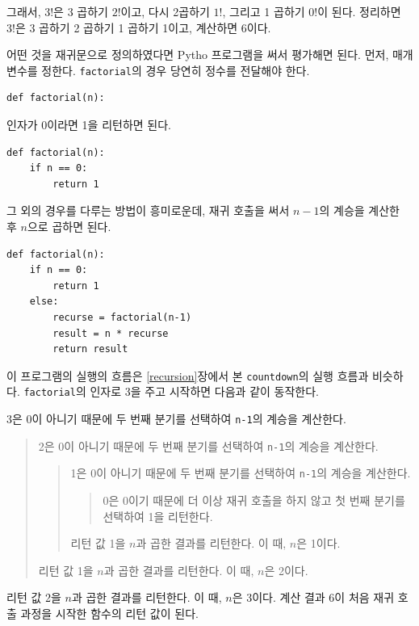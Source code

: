 \documentclass[10pt]{book}
\begin{document}
그래서, $3!$은 3 곱하기 $2!$이고, 다시 2곱하기 $1!$, 그리고 1 곱하기
$0!$이 된다.  정리하면 $3!$은 3 곱하기 2 곱하기 1 곱하기 1이고,
계산하면 6이다.

어떤 것을 재귀문으로 정의하였다면 Pytho 프로그램을 써서 평가해면 된다.
먼저, 매개 변수를 정한다.  {\tt factorial}의 경우 당연히 정수를
전달해야 한다.

\begin{verbatim}
def factorial(n):
\end{verbatim}
%
인자가 0이라면 1을 리턴하면 된다.

\begin{verbatim}
def factorial(n):
    if n == 0:
        return 1
\end{verbatim}
%
그 외의 경우를 다루는 방법이 흥미로운데, 재귀 호출을 써서 $n-1$의
계승을 계산한 후 $n$으로 곱하면 된다.

\begin{verbatim}
def factorial(n):
    if n == 0:
        return 1
    else:
        recurse = factorial(n-1)
        result = n * recurse
        return result
\end{verbatim}
%
이 프로그램의 실행의 흐름은 \ref{recursion}장에서 본 {\tt countdown}의
실행 흐름과 비슷하다. {\tt factorial}의 인자로 3을 주고 시작하면 다음과
같이 동작한다.


3은 0이 아니기 때문에 두 번째 분기를 선택하여 {\tt n-1}의 계승을 계산한다. 

\begin{quote}
  2은 0이 아니기 때문에 두 번째 분기를 선택하여 {\tt n-1}의 계승을
  계산한다.



  \begin{quote}
    1은 0이 아니기 때문에 두 번째 분기를 선택하여 {\tt n-1}의 계승을
    계산한다.

    \begin{quote}
      0은 0이기 때문에 더 이상 재귀 호출을 하지 않고 첫 번째 분기를
      선택하여 1을 리턴한다.
    \end{quote}

    리턴 값 1을  $n$과 곱한 결과를 리턴한다.  이 때, $n$은 1이다. 
  \end{quote}

    리턴 값 1을  $n$과 곱한 결과를 리턴한다.  이 때, $n$은 2이다. 

\end{quote}

리턴 값 2을 $n$과 곱한 결과를 리턴한다.  이 때, $n$은 3이다.  계산 결과
6이 처음 재귀 호출 과정을 시작한 함수의 리턴 값이 된다.
\end{document}
